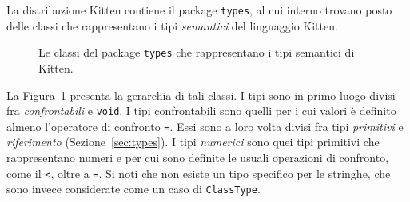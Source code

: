 La distribuzione Kitten contiene il package \texttt{types}, al cui interno
trovano posto delle classi che rappresentano i tipi \emph{semantici}
del linguaggio Kitten.
%
\begin{figure}
\begin{center}
\end{center}
\caption{Le classi del package \texttt{types} che rappresentano i tipi semantici di Kitten.}\label{fig:semantical_types}
\end{figure}
%
La Figura~\ref{fig:semantical_types} presenta la gerarchia di tali classi.
I tipi sono in primo luogo divisi fra \emph{confrontabili} e \texttt{void}.
I tipi confrontabili sono quelli per i cui valori \`e definito almeno
l'operatore di confronto \texttt{=}. Essi sono a loro volta divisi fra
tipi \emph{primitivi} e \emph{riferimento} (Sezione~\ref{sec:types}). I tipi
\emph{numerici} sono quei tipi primitivi che rappresentano numeri e per
cui sono definite le usuali operazioni di confronto, come il \texttt{<},
oltre a \texttt{=}.
Si noti che non esiste un tipo specifico per le stringhe, che sono invece
considerate come un caso di \texttt{ClassType}.

